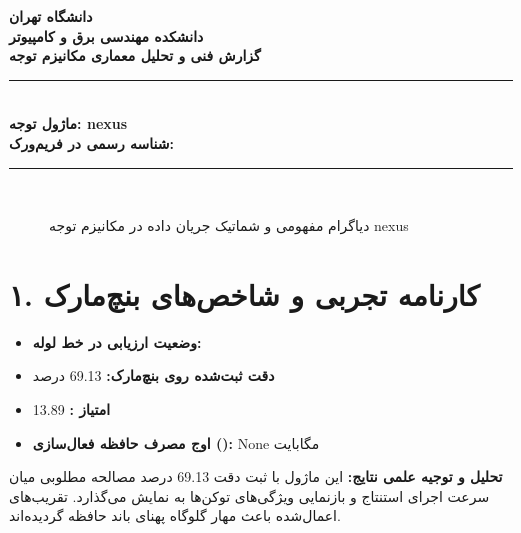 \documentclass[12pt,a4paper]{article}
\begin{document}
\begin{center}
{\Large\bfseries دانشگاه تهران}\\[0.2cm]
{\large\bfseries دانشکده مهندسی برق و کامپیوتر}\\[0.2cm]
{\large\bfseries گزارش فنی و تحلیل معماری مکانیزم توجه}\\[0.5cm]
\rule{\linewidth}{1pt}\\[0.3cm]
{\LARGE\bfseries ماژول توجه: nexus}\\[0.2cm]
{\large \textbf{شناسه رسمی در فریم‌ورک:} }\\[0.2cm]
\rule{\linewidth}{1pt}\\[0.5cm]
\end{center}

\begin{figure}[H]
\centering
{}
\caption{دیاگرام مفهومی و شماتیک جریان داده در مکانیزم توجه nexus}
\end{figure}

\section*{۱. کارنامه تجربی و شاخص‌های بنچ‌مارک}
\begin{itemize}
\item \textbf{وضعیت ارزیابی در خط لوله:} 
\item \textbf{دقت ثبت‌شده روی بنچ‌مارک:} 69.13 درصد
\item \textbf{امتیاز :} 13.89
\item \textbf{اوج مصرف حافظه فعال‌سازی ():} None مگابایت
\end{itemize}
\textbf{تحلیل و توجیه علمی نتایج:} این ماژول با ثبت دقت 69.13 درصد مصالحه مطلوبی میان سرعت اجرای استنتاج و بازنمایی ویژگی‌های توکن‌ها به نمایش می‌گذارد. تقریب‌های اعمال‌شده باعث مهار گلوگاه پهنای باند حافظه گردیده‌اند.
\end{document}
